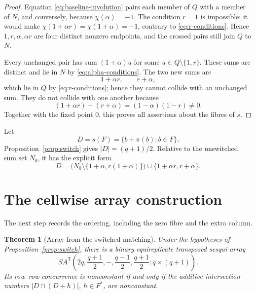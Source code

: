 \documentclass[11pt]{article}
\newtheorem{theorem}{Theorem}[section]
\theoremstyle{definition}
\theoremstyle{remark}
\newcommand{\SA}{SA^{\mathsf T}}
\begin{document}
\begin{proof}
Equation \eqref{eq:baseline-involution} pairs each member of \(Q\) with a
member of \(N\), and conversely, because \(\chi(\alpha)=-1\).  The condition
\(r=1\) is impossible: it would make
\(\chi(1+\alpha r)=\chi(1+\alpha)=-1\), contrary to
\eqref{eq:r-conditions}.  Hence \(1,r,\alpha,\alpha r\) are four distinct
nonzero endpoints, and the crossed pairs still join \(Q\) to \(N\).

Every unchanged pair has sum \((1+\alpha)u\) for some
\(u\in Q\setminus\{1,r\}\).  These sums are distinct and lie in \(N\) by
\eqref{eq:alpha-conditions}.  The two new sums are
\[
 1+\alpha r,\qquad r+\alpha,
\]
which lie in \(Q\) by \eqref{eq:r-conditions}; hence they cannot collide with
an unchanged sum.  They do not collide with one another because
\[
 (1+\alpha r)-(r+\alpha)=(1-\alpha)(1-r)\ne0.
\]
Together with the fixed point \(0\), this proves all assertions about the
fibres of \(s\).
\end{proof}

Let
\begin{equation}
 D=s(F)=\{b+\pi(b):b\in F\}.
 \label{eq:D-definition}
\end{equation}
Proposition~\ref{prop:switch} gives \(|D|=(q+1)/2\).  Relative to the
unswitched sum set \(N_0\), it has the explicit form
\begin{equation}
 D=\bigl(N_0\setminus\{1+\alpha,r(1+\alpha)\}\bigr)
 \cup\{1+\alpha r,r+\alpha\}.
 \label{eq:D-switch}
\end{equation}

\section{The cellwise array construction}
The next step records the ordering, including the zero fibre and the extra
column.

\begin{theorem}[Array from the switched matching]
\label{thm:cellwise}
Under the hypotheses of Proposition~\ref{prop:switch}, there is a binary
equireplicate transposed sesqui array
\[
 \SA\!\left(
 2q,\frac{q+1}{2},-,\frac{q-1}{2},\frac{q+1}{2}:q\times(q+1)
 \right).
\]
Its row--row concurrence is nonconstant if and only if the additive
intersection numbers \(|D\cap(D+h)|\), \(h\in F^*\), are nonconstant.
\end{theorem}
\end{document}
